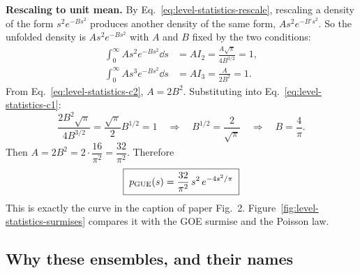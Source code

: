 \textbf{Rescaling to unit mean.} By Eq.~\eqref{eq:level-statistics-rescale}, rescaling a density of the form $s^2e^{-Bs^2}$ produces another density of the same form, $As^2e^{-B's^2}$. So the unfolded density is $As^2e^{-Bs^2}$ with $A$ and $B$ fixed by the two conditions:
\begin{align}
\int_0^\infty As^2e^{-Bs^2}\dd s&=AI_2=\frac{A\sqrt\pi}{4B^{3/2}}=1, \label{eq:level-statistics-c1}\\
\int_0^\infty As^3e^{-Bs^2}\dd s&=AI_3=\frac{A}{2B^2}=1 .\label{eq:level-statistics-c2}
\end{align}
From Eq.~\eqref{eq:level-statistics-c2}, $A=2B^2$. Substituting into Eq.~\eqref{eq:level-statistics-c1}:
\begin{equation}
\frac{2B^2\sqrt\pi}{4B^{3/2}}=\frac{\sqrt\pi}{2}B^{1/2}=1
\quad\Longrightarrow\quad B^{1/2}=\frac{2}{\sqrt\pi}
\quad\Longrightarrow\quad B=\frac4\pi .
\end{equation}
Then $A=2B^2=2\cdot\dfrac{16}{\pi^2}=\dfrac{32}{\pi^2}$. Therefore
\begin{equation}
\boxed{\;p_{\rm GUE}(s)=\frac{32}{\pi^2}\,s^2\,e^{-4s^2/\pi}\;}
\label{eq:level-statistics-gue}
\end{equation}
This is exactly the curve in the caption of paper Fig.~2. Figure~\ref{fig:level-statistics-surmises} compares it with the GOE surmise and the Poisson law.

\subsection{Why these ensembles, and their names}

